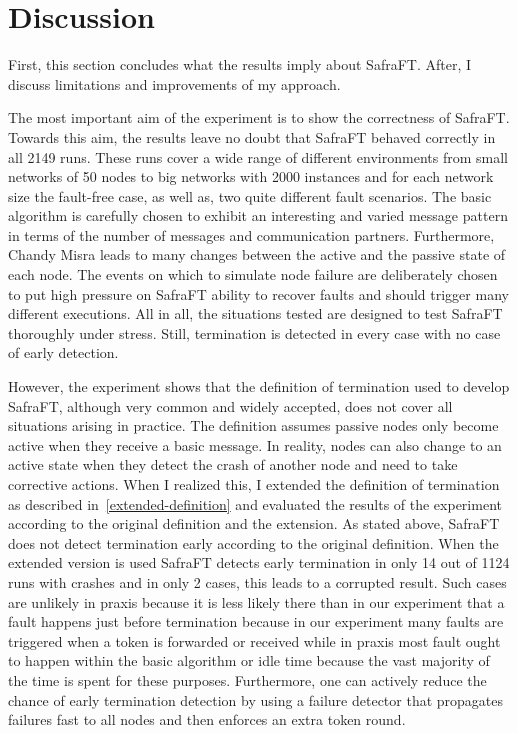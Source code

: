 \section{Discussion}
First, this section concludes what the results imply about SafraFT. After, I discuss limitations and improvements of my approach.

The most important aim of the experiment is to show the correctness of SafraFT.
Towards this aim, the results leave no doubt that SafraFT behaved correctly in all 2149 %
runs.
These runs cover a wide range of different environments from small networks of 50 nodes to big networks with 2000 instances and for each network size the fault-free case, as well as, two quite different fault scenarios.
The basic algorithm is carefully chosen to exhibit an interesting and varied message pattern in terms of the number of messages and communication partners.
Furthermore, Chandy Misra leads to many changes between the active and the passive state of each node.
The events on which to simulate node failure are deliberately chosen to put high pressure on SafraFT ability to recover faults and should trigger many different executions.
All in all, the situations tested are designed to test SafraFT thoroughly under stress.
Still, termination is detected in every case with no case of early detection.

However, the experiment shows that the definition of termination used to develop SafraFT, although very common and widely accepted, does not cover all situations arising in practice.
The definition assumes passive nodes only become active when they receive a basic message.
In reality, nodes can also change to an active state when they detect the crash of another node and need to take corrective actions.
When I realized this, I extended the definition of termination as described in~\cref{extended-definition} and evaluated the results of the experiment according to the original definition and the extension.
As stated above, SafraFT does not detect termination early according to the original definition.
When the extended version is used SafraFT detects early termination in only 14 out of 1124 runs with crashes and in only 2 cases, this leads to a corrupted result. %
Such cases are unlikely in praxis because it is less likely there than in our experiment that a fault happens just before termination because in our experiment many faults are triggered when a token is forwarded or received while in praxis most fault ought to happen within the basic algorithm or idle time because the vast majority of the time is spent for these purposes.
Furthermore, one can actively reduce the chance of early termination detection by using a failure detector that propagates failures fast to all nodes and then enforces an extra token round.


